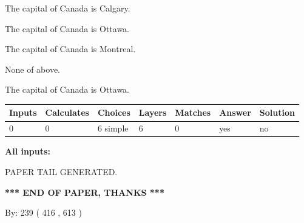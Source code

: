 \documentclass[12pt]{article}
\begin{document}
 
The capital of Canada is Calgary.
 
 
The capital of Canada is Ottawa.
 
 
The capital of Canada is Montreal.
 
 
 None of above.
 
 
\noindent{}
 
 
The capital of Canada is Ottawa.
 
 
\noindent{}
 
 
   
   
   
   
\noindent\begin{tabular}{|l|l|l|l|l|l|l|}
 \hline
Inputs & Calculates & Choices & Layers & Matches & Answer & Solution \\ \hline
 0  & 
 0  & 
 6
  simple  
  & 
 6  & 
 0  & 
  yes & 
  no 
  \\ \hline
 \end{tabular}
   
   
   
   
\noindent{}
   
   
   
   
\noindent\vspace{0.1in}\hspace{-0.08in} {\textbf{\Large{All inputs: }}}
   
   
   
   
   
   
 \vspace{0.2in}
 
   
   
\vspace{2.0in} PAPER TAIL GENERATED.
   
   
   
   
\vspace{1.0in} 
{\textbf{\large{ *** END OF PAPER, THANKS *** }}} 
   
   
\hspace{1.0in} By: 
 239 ( 416 ,  613 )
   
   
   
   
\newpage 
\setcounter{page}{ 
   594001 } 
   
\end{document}
